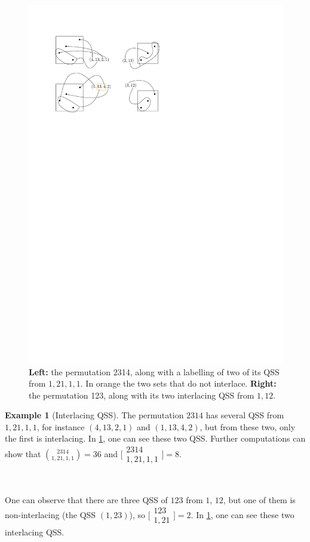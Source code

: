 \documentclass[12pt, reqno]{amsart}
\theoremstyle{definition}
\newtheorem{smpl}[thm]{Example}
\begin{document}
\begin{figure}[h]
    \centering
    \includegraphics{images/interlacing_25314.pdf}
    \caption{\textbf{Left:} the permutation 2314, along with a labelling of two of its QSS from $1, 21, 1, 1$. In orange the two sets that do not interlace. \textbf{Right:} the permutation 123, along with its two interlacing QSS from $1, 12$.\label{fig:interlacingQSSsmpl}}
\end{figure}


\begin{smpl}[Interlacing QSS]
The permutation $2314$ has several QSS from $1, 21, 1, 1$, for instance $(4, 13, 2, 1)$ and $(1, 13, 4, 2)$, but from these two, only the first is interlacing.
In \cref{fig:interlacingQSSsmpl}, one can see these two QSS.
Further computations can show that $\binom{2314}{1, 21, 1, 1} = 36$ and $\bigl[\!\begin{smallmatrix} 2314 \\ 1, 21, 1, 1 \end{smallmatrix}\!\bigr] = 8$.

\

One can observe that there are three QSS of $123$ from $1$, $12$, but one of them is non-interlacing (the QSS $(1,23)$), so
$\bigl[\!\begin{smallmatrix} 123 \\ 1, 21 \end{smallmatrix}\!\bigr] = 2$.
In \cref{fig:interlacingQSSsmpl}, one can see these two interlacing QSS.
\end{smpl}
\end{document}
